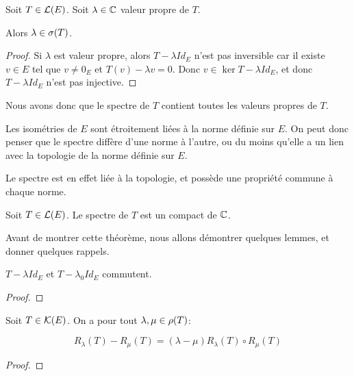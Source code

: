 \begin{proposition}
	Soit $T \in \mathcal{L}(E)$.
	Soit $\lambda \in \mathbb{C}$ valeur propre de $T$.

	Alors $\lambda \in \sigma(T)$.
\end{proposition}

\begin{proof}
	Si $\lambda$ est valeur propre, alors $T - \lambda Id_{E}$ n'est pas
	inversible car il existe $v \in E$ tel que $v \neq 0_{E}$ et $T(v) - \lambda
	v = 0$. Donc $v \in \ker{T - \lambda Id_{E}}$, et donc $T - \lambda Id_{E}$
	n'est pas injective.
\end{proof}

Nous avons donc que le spectre de $T$ contient toutes les valeurs propres de
$T$.

Les isométries de $E$ sont étroitement liées à la norme définie sur $E$. On peut
donc penser que le spectre diffère d'une norme à l'autre, ou du moins qu'elle a
un lien avec la topologie de la norme définie sur $E$.

Le spectre est en effet liée à la topologie, et possède une propriété commune à
chaque norme.

\begin{theorem}
	\label{thm:spectrum_compact}
	Soit $T \in \mathcal{L}(E)$.
	Le spectre de $T$ est un compact de $\mathbb{C}$.
\end{theorem}

Avant de montrer cette théorème, nous allons démontrer quelques lemmes, et
donner quelques rappels.

\begin{lemma}
	$T - \lambda Id_{E}$ et $T - \lambda_{0} Id_{E}$ commutent.
\end{lemma}

\begin{proof}
	
\end{proof}

\begin{proposition} 
	\label{prop:resolvante_identity}
	Soit $T \in \mathcal{K}(E)$.
	On a pour tout $\lambda, \mu \in \rho(T)$:

	\begin{equation}
		R_{\lambda}(T) - R_{\mu}(T) = (\lambda - \mu) R_{\lambda}(T) \circ
		R_{\mu}(T)
	\end{equation}
\end{proposition}

\begin{proof}

\end{proof}

